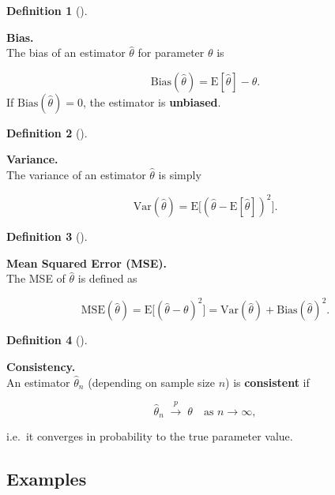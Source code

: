 \documentclass[
  letterpaper,
  DIV=11,
  numbers=noendperiod]{scrreprt}
\theoremstyle{definition}
\theoremstyle{plain}
\theoremstyle{definition}
\newtheorem{definition}{Definition}[chapter]
\theoremstyle{remark}
\begin{document}
\begin{definition}[]\protect\hypertarget{def-bias}{}\label{def-bias}

\textbf{Bias.}\\
The bias of an estimator \(\hat{\theta}\) for parameter \(\theta\) is

\[
\mathrm{Bias}(\hat{\theta}) = \mathrm{E}[\hat{\theta}] - \theta.
\] If \(\mathrm{Bias}(\hat{\theta}) = 0\), the estimator is
\textbf{unbiased}.

\end{definition}

\begin{definition}[]\protect\hypertarget{def-variance}{}\label{def-variance}

\textbf{Variance.}\\
The variance of an estimator \(\hat{\theta}\) is simply

\[
\mathrm{Var}(\hat{\theta}) = \mathrm{E}\!\big[(\hat{\theta}-\mathrm{E}[\hat{\theta}])^2\big].
\]

\end{definition}

\begin{definition}[]\protect\hypertarget{def-mse}{}\label{def-mse}

\textbf{Mean Squared Error (MSE).}\\
The MSE of \(\hat{\theta}\) is defined as

\[
\mathrm{MSE}(\hat{\theta}) 
= \mathrm{E}\!\big[(\hat{\theta}-\theta)^2\big] 
= \mathrm{Var}(\hat{\theta}) + \mathrm{Bias}(\hat{\theta})^2.
\]

\end{definition}

\begin{definition}[]\protect\hypertarget{def-consistency}{}\label{def-consistency}

\textbf{Consistency.}\\
An estimator \(\hat{\theta}_n\) (depending on sample size \(n\)) is
\textbf{consistent} if

\[
\hat{\theta}_n \;\xrightarrow{p}\; \theta 
\quad \text{as } n \to \infty,
\]

i.e.~it converges in probability to the true parameter value.

\end{definition}

\subsection{Examples}\label{examples}
\end{document}
